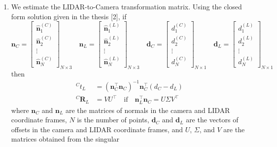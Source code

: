 \documentclass[10pt]{article}
\begin{document}
\begin{enumerate}
        \item We estimate the LIDAR-to-Camera transformation matrix. Using the closed form solution
        given in the thesis [2], if
        \begin{equation*}
            \mathbf{n}_{C} = \begin{bmatrix}
                \hat{\mathbf{n}}_{1}^{(C)} \\ \hat{\mathbf{n}}_{2}^{(C)} \\ \vdots \\ \hat{\mathbf{n}}_{N}^{(C)}
            \end{bmatrix}_{N \times 3} \quad
            \mathbf{n}_{L} = \begin{bmatrix}
                \hat{\mathbf{n}}_{1}^{(L)} \\ \hat{\mathbf{n}}_{2}^{(L)} \\ \vdots \\ \hat{\mathbf{n}}_{N}^{(L)}
            \end{bmatrix}_{N \times 3} \quad
            \mathbf{d}_{C} = \begin{bmatrix}
                d_{1}^{(C)} \\ d_{2}^{(C)} \\ \vdots \\ d_{N}^{(C)}
            \end{bmatrix}_{N \times 1} \quad
            \mathbf{d}_{L} = \begin{bmatrix}
                d_{1}^{(L)} \\ d_{2}^{(L)} \\ \vdots \\ d_{N}^{(L)}
            \end{bmatrix}_{N \times 1}
        \end{equation*}
        then
        \begin{align*}
            ^{C} t_{L} &= (\mathbf{n}_{C}^{\top} \mathbf{n}_{C})^{-1} \mathbf{n}_{C}^{\top} (d_{C} - d_{L}) \\
            ^{C} \mathbf{R}_{L} &= V U^{\top} \quad \text{if} \quad
            \mathbf{n}_{L}^{\top} \mathbf{n}_{C} = U \Sigma V^{\top}
        \end{align*}
        where $\mathbf{n}_{C}$ and $\mathbf{n}_{L}$ are the matrices of normals in the
        camera and LIDAR coordinate frames, $N$ is the number of points, $\mathbf{d}_{C}$
        and $\mathbf{d}_{L}$ are the vectors of offsets in the camera and LIDAR coordinate
        frames, and $U$, $\Sigma$, and $V$ are the matrices obtained from the singular

\end{enumerate}
\end{document}
